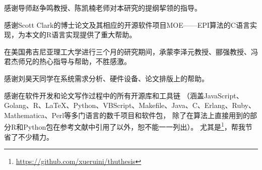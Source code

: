 \documentclass[degree=bachelor,tocarialchapter]{../thuthesis/thuthesis}
\let\oldlabel\label%
\let\oldref\ref%
\let\oldcref\cref%
\let\oldCref\Cref%
\newcommand{\addlabelprefix}[1]{%
  \renewcommand{\label}[1]{\oldlabel{#1-##1}}%
  \renewcommand{\ref}[1]{\oldref{#1-##1}}%
}
\newcommand{\addlabelprefixc}[1]{%
  \renewcommand{\label}[1]{\oldlabel{#1-##1}}%
  \renewcommand{\cref}[1]{\oldcref{#1-##1}}%
  \renewcommand{\Cref}[1]{\oldCref{#1-##1}}%
}
\newcommand{\removelabelprefix}{%
  \renewcommand{\label}{\oldlabel}%
  \renewcommand{\ref}{\oldref}%
  \renewcommand{\cref}{\oldcref}%
  \renewcommand{\Cref}{\oldCref}%
}
\begin{document}









\backmatter

\listoffigures
\listoftables
\listofequations




\begin{acknowledgement}
  感谢导师赵争鸣教授、陈凯楠老师对本研究的提纲挈领的指导。

  感谢Scott Clark的博士论文\cite{clark2012}及其相应的开源软件项目MOE——EPI算法的C语言实现，为本文的R语言实现提供了重大帮助。

  在美国弗吉尼亚理工大学进行三个月的研究期间，承蒙李泽元教授、郦强教授、冯君杰师兄的热心指导与帮助，不胜感激。

  感谢刘昊天同学在系统需求分析、硬件设备、论文排版上的帮助。

  感谢在软件开发和论文写作过程中的所有开源库和工具链
  （涵盖JavaScript、Golang、R、\LaTeX、Python、VBScript、Makefile、Java、C、Erlang、Ruby、Mathematica、Perl等多门语言的数千项目和软件包，
  除了在算法上直接用到的部分R和Python包在参考文献中引用了以外，恕不能一一列出）。
  尤其是\thuthesis\footnote{\href{https://github.com/xueruini/thuthesis}{https://github.com/xueruini/thuthesis}}，帮我节省了不少精力。
\end{acknowledgement}

\begin{appendix}
\ifdefined\stripped\relax\else
{}
\addtocontents{lof}{\protect\iffalse}
\addtocontents{lot}{\protect\iffalse}
\addtocontents{loe}{\protect\iffalse}
\addlabelprefixc{trans}

\removelabelprefix
\addlabelprefix{raw}

\removelabelprefix
\addtocontents{toc}{\protect\setcounter{tocdepth}{5}}
\addtocontents{lof}{\protect\fi}
\addtocontents{lot}{\protect\fi}
\addtocontents{loe}{\protect\fi}
\fi

\end{appendix}
\end{document}
